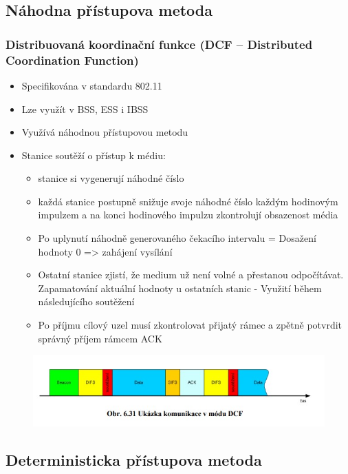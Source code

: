 \subsection{Náhodna přístupova metoda}
\subsubsection{Distribuovaná koordinační funkce (DCF – Distributed Coordination Function) }
\begin{itemize}
    \item Specifikována v standardu 802.11 
    \item Lze využít v BSS, ESS i IBSS 
    \item Využívá náhodnou přístupovou metodu
    \item Stanice soutěží o přístup k médiu: 
    \begin{itemize}
    \item stanice si vygenerují náhodné číslo
    \item každá stanice postupně snižuje svoje náhodné číslo každým hodinovým impulzem
a na konci hodinového impulzu zkontrolují obsazenost média
    \item Po uplynutí náhodně generovaného čekacího intervalu = Dosažení hodnoty 0 =>
zahájení vysílání
    \item Ostatní stanice zjistí, že medium už není volné a přestanou odpočítávat.
Zapamatování aktuální hodnoty u ostatních stanic - Využití během následujícího
soutěžení
    \item Po příjmu cílový uzel musí zkontrolovat přijatý rámec a zpětně potvrdit správný
příjem rámcem ACK
    \end{itemize}
\end{itemize}
\begin{figure}[ht]
\centering
  \begin{center}
    \includegraphics[scale=0.9]{BPC-HWS/images/dcf.jpg}
  \end{center}
\end{figure}

\subsection{Deterministicka přístupova metoda}
